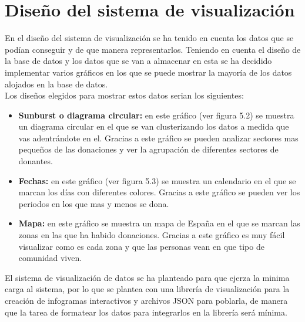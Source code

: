\section{Diseño del sistema de visualización}
En el diseño del sistema de visualización se ha tenido en cuenta los datos que se podían conseguir y de que manera representarlos. Teniendo en cuenta el diseño de la base de datos y los datos que se van a almacenar en esta se ha decidido implementar varios gráficos en los que se puede mostrar la mayoría de los datos alojados en la base de datos.\\

Los diseños elegidos para mostrar estos datos serian los siguientes:

\begin{itemize}
	\item \textbf{Sunburst o diagrama circular:} en este gráfico (ver figura 5.2) se muestra un diagrama circular en el que se van clusterizando los datos a medida que vas adentrándote en el. Gracias a este gráfico se pueden analizar sectores mas pequeños de las donaciones y ver la agrupación de diferentes sectores de donantes.
	\item \textbf{Fechas:} en este gráfico (ver figura 5.3) se muestra un calendario en el que se marcan los días con diferentes colores. Gracias a este gráfico se pueden ver los periodos en los que mas y menos se dona.
	\item \textbf{Mapa:} en este gráfico se muestra un mapa de España en el que se marcan las zonas en las que ha habido donaciones. Gracias a este gráfico es muy fácil visualizar como es cada zona y que las personas vean en que tipo de comunidad viven.
\end{itemize} 

El sistema de visualización de datos se ha planteado para que ejerza la minima carga al sistema, por lo que se plantea con una librería de visualización para la creación de infogramas interactivos y archivos JSON para poblarla, de manera que la tarea de formatear los datos para integrarlos en la librería será mínima.

